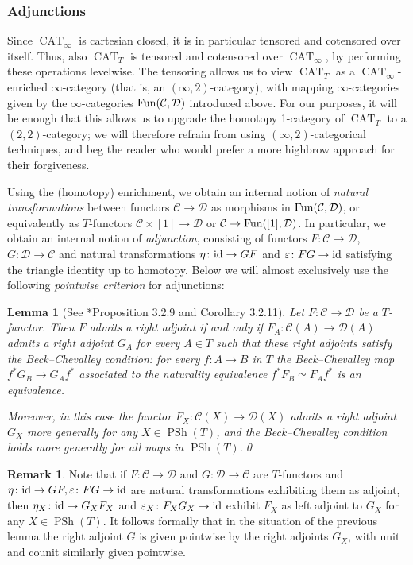\documentclass[reqno]{memo-l}
\theoremstyle{mythm}
\newtheorem{lemma}[thm]{Lemma}
\theoremstyle{definition}
\newtheorem{rk}[thm]{Remark}
\numberwithin{equation}{section}
\newcommand{\Cc}{{\mathcal{C}}}
\newcommand{\Dd}{{\mathcal{D}}}
\renewcommand{\epsilon}{\varepsilon}
\DeclareMathOperator{\CAT}{CAT}
\newcommand{\Fun}{{\textup{Fun}}}
\DeclareMathOperator{\PSh}{PSh}
\newcommand{\id}{\textup{id}}
\begin{document}
\subsubsection{Adjunctions} Since $\CAT_\infty$ is cartesian closed, it is in particular tensored and cotensored over itself. Thus, also $\CAT_T$ is tensored and cotensored over $\CAT_\infty$, by performing these operations levelwise. The tensoring allows us to view $\CAT_T$ as a $\CAT_\infty$-enriched $\infty$-category (that is, an $(\infty,2)$-category), with mapping $\infty$-categories given by the $\infty$-categories $\Fun(\Cc,\Dd)$ introduced above. For our purposes, it will be enough that this allows us to upgrade the homotopy 1-category of $\CAT_T$ to a $(2,2)$-category; we will therefore refrain from using $(\infty,2)$-categorical techniques, and beg the reader who would prefer a more highbrow approach for their forgiveness.

Using the (homotopy) enrichment, we obtain an internal notion of \emph{natural transformations} between functors $\Cc\to\Dd$ as morphisms in $\Fun(\Cc,\Dd)$, or equivalently as $T$-functors $\Cc\times[1]\to\Dd$ or $\Cc\to\Fun([1],\Dd)$. In particular, we obtain an internal notion of \emph{adjunction}, consisting of functors $F\colon\Cc\to\Dd$, $G\colon\Dd\to\Cc$ and natural transformations $\eta\colon\id\to GF$ and $\epsilon\colon FG\to\id$ satisfying the triangle identity up to homotopy. Below we will almost exclusively use the following \emph{pointwise criterion} for adjunctions:

\begin{lemma}[See \cite{martiniwolf2021limits}*{Proposition 3.2.9 and Corollary 3.2.11}]
    \label{lemma:pointwise-criterion}
    Let $F\colon\Cc\to\Dd$ be a $T$-functor. Then $F$ admits a right adjoint if and only if $F_A\colon\Cc(A)\to\Dd(A)$ admits a right adjoint $G_A$ for every $A\in T$ such that these right adjoints satisfy the \emph{Beck--Chevalley condition}: for every $f\colon A\to B$ in $T$ the Beck--Chevalley map $f^*G_B\to G_Af^*$ associated to the naturality equivalence $f^*F_B\simeq F_Af^*$ is an equivalence. 
    
    Moreover, in this case the functor $F_X\colon\Cc(X)\to\Dd(X)$ admits a right adjoint $G_X$ more generally for any $X\in\PSh(T)$, and the Beck--Chevalley condition holds more generally for all maps in $\PSh(T)$.\qed
\end{lemma}

\begin{rk}\label{rk:adjunctions-pw-unit-counit}
    Note that if $F\colon\Cc\to\Dd$ and $G\colon\Dd\to\Cc$ are $T$-functors and $\eta\colon\id\to GF,\epsilon\colon FG\to\id$ are natural transformations exhibiting them as adjoint, then $\eta_X\colon\id\to G_XF_X$ and $\epsilon_X\colon F_XG_X\to\id$ exhibit $F_X$ as left adjoint to $G_X$ for any $X\in\PSh(T)$. It follows formally that in the situation of the previous lemma the right adjoint $G$ is given pointwise by the right adjoints $G_X$, with unit and counit similarly given pointwise.
\end{rk}
\end{document}
